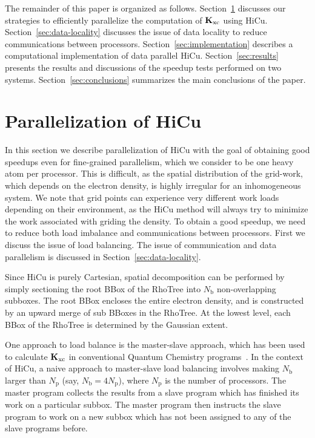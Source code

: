 \commentoutA{\documentclass[prl,aps,twocolumn,showpacs,twocolumngrid,superbib]{revtex4}}
\newcommand{\Kxc}{{\bf K}_{\mathrm{xc}}}
\newcommand{\Np}{N_{\mathrm{p}}} \newcommand{\Nbox}{N_{\mathrm{b}}}
\begin{document}
The remainder of this paper is organized as follows.
Section~\ref{sec:parahicu} discusses our strategies to efficiently
parallelize the computation of $\Kxc$ using HiCu.
Section~\ref{sec:data-locality} discusses the issue of data locality
to reduce communications between processors.
Section~\ref{sec:implementation} describes a computational
implementation of data parallel HiCu.  Section~\ref{sec:results}
presents the results and discussions of the speedup tests performed on
two systems. Section~\ref{sec:conclusions} summarizes the main
conclusions of the paper.

\section{Parallelization of HiCu}
\label{sec:parahicu}
In this section we describe parallelization of HiCu with the goal of
obtaining good speedups even for fine-grained parallelism, which we
consider to be one heavy atom per processor.  This is difficult, as
the spatial distribution of the grid-work, which depends on the
electron density, is highly irregular for an inhomogeneous system.  We
note that grid points can experience very different work loads
depending on their environment, as the HiCu method will always try to
minimize the work associated with griding the density.  To obtain a
good speedup, we need to reduce both load imbalance and communications
between processors. First we discuss the issue of load balancing. The
issue of communication and data parallelism is discussed in
Section~\ref{sec:data-locality}.

Since HiCu is purely Cartesian, spatial decomposition can be performed
by simply sectioning the root BBox of the RhoTree into $\Nbox$
non-overlapping subboxes.  The root BBox encloses the entire electron
density, and is constructed by an upward merge of sub BBoxes in the
RhoTree.  At the lowest level, each BBox of the RhoTree is determined
by the Gaussian extent.

One approach to load balance is the master-slave approach, which has
been used to calculate $\Kxc$ in conventional Quantum Chemistry
programs~\cite{Baker_02v23,Furlani_00v128,Yoshihiro_01v346}.  In the context of HiCu, 
a naive approach to master-slave load balancing involves making
$\Nbox$ larger than $\Np$ (say, $\Nbox= 4\Np$), where $\Np$ is the
number of processors. The master program collects the results from a
slave program which has finished its work on a particular subbox. The
master program then instructs the slave program to work on a new
subbox which has not been assigned to any of the slave programs
before.
\end{document}
